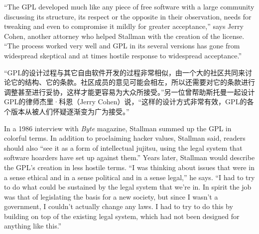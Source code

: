 \ifdefined\eng
``The GPL developed much like any piece of free software with a large community discussing its structure, its respect or the opposite in their observation, needs for tweaking and even to compromise it mildly for greater acceptance,'' says Jerry Cohen, another attorney who helped Stallman with the creation of the license. ``The process worked very well and GPL in its several versions has gone from widespread skeptical and at times hostile response to widespread acceptance.''
\fi

\ifdefined\chs
``GPL的设计过程与其它自由软件开发的过程非常相似，由一个大的社区共同来讨论它的结构、它的条款。社区成员的意见可能会相左，所以还需要对它的条款进行调整甚至进行妥协，这样才能更容易为大众所接受。''另一位曾帮助斯托曼一起设计GPL的律师杰里·科恩（Jerry Cohen）说，``这样的设计方式非常有效，GPL的各个版本从被人们怀疑逐渐变为广为接受。''
\fi

\ifdefined\eng
In a 1986 interview with \textit{Byte} magazine, Stallman summed up the GPL in colorful terms. In addition to proclaiming hacker values, Stallman said, readers should also ``see it as a form of intellectual jujitsu, using the legal system that software hoarders have set up against them.'' Years later, Stallman would describe the GPL's creation in less hostile terms. ``I was thinking about issues that were in a sense ethical and in a sense political and in a sense legal,'' he says. ``I had to try to do what could be sustained by the legal system that we're in. In spirit the job was that of legislating the basis for a new society, but since I wasn't a government, I couldn't actually change any laws. I had to try to do this by building on top of the existing legal system, which had not been designed for anything like this.''
\fi

